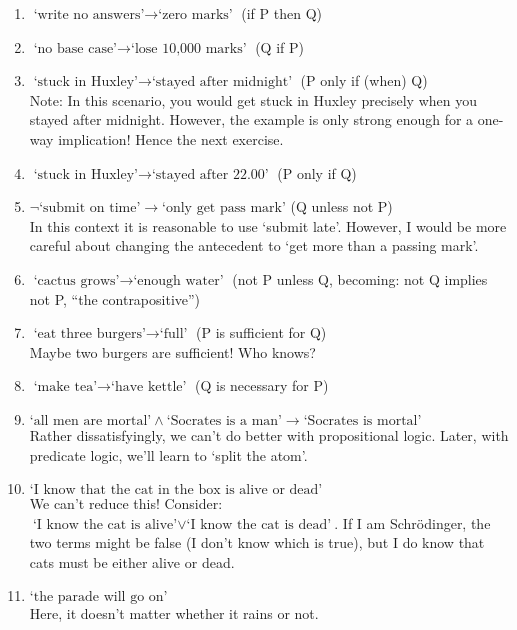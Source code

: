 \documentclass[10pt,a4paper]{article}
\begin{document}
\begin{enumerate}
    \item \( \textrm{`write no answers'} \rightarrow \textrm{`zero marks'} \) (if P then Q)
    \item \( \textrm{`no base case'} \rightarrow \textrm{`lose 10,000 marks'} \) (Q if P)
    \item \( \textrm{`stuck in Huxley'} \rightarrow \textrm{`stayed after midnight'} \) (P only if (when) Q) \\
    Note: In this scenario, you would get stuck in Huxley precisely when you stayed after midnight. However, the example is only strong enough for a one-way implication! Hence the next exercise.
    \item \( \textrm{`stuck in Huxley'} \rightarrow \textrm{`stayed after 22.00'} \) (P only if Q)
    \item \( \neg \textrm{`submit on time'} \rightarrow \textrm{`only get pass mark'} \) (Q unless not P) \\
    In this context it is reasonable to use `submit late'. However, I would be more careful about changing the antecedent to `get more than a passing mark'.
    \item \( \textrm{`cactus grows'} \rightarrow \textrm{`enough water'} \) (not P unless Q, becoming: not Q implies not P, ``the contrapositive'')
    \item \( \textrm{`eat three burgers'} \rightarrow \textrm{`full'} \) (P is sufficient for Q) \\
    Maybe two burgers are sufficient! Who knows?
    \item \( \textrm{`make tea'} \rightarrow \textrm{`have kettle'} \) (Q is necessary for P)
    \item \( \textrm{`all men are mortal'} \land \textrm{`Socrates is a man'} \rightarrow \textrm{`Socrates is mortal'} \) \\
    Rather dissatisfyingly, we can't do better with propositional logic. Later, with predicate logic, we'll learn to `split the atom'.
    \item \( \textrm{`I know that the cat in the box is alive or dead'}\) \\
    We can't reduce this! Consider: \( \textrm{`I know the cat is alive'} \lor \textrm{`I know the cat is dead'}\).
    If I am Schr{\"o}dinger, the two terms might be false (I don't know which is true), but I do know that cats must be either alive or dead.
    \item \( \textrm{`the parade will go on'}\) \\
    Here, it doesn't matter whether it rains or not.
\end{enumerate}
\end{document}
